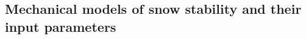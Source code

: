 \documentclass[hess, manuscript]{copernicus}
\begin{document}
\subsection{Mechanical models of snow stability and their input parameters}

%
%
%
\end{document}
